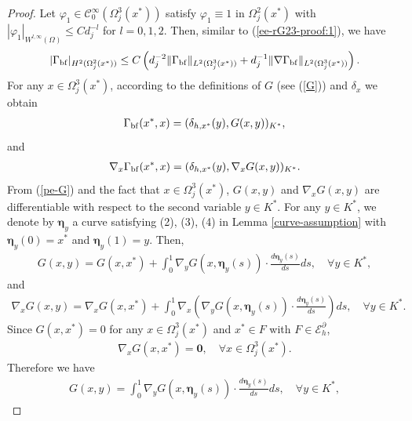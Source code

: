 \documentclass[1996/10/24]{amsart}
\theoremstyle{definition}
\numberwithin{equation}{section}
\begin{document}
\begin{proof}
Let $\varphi_1\in\mathcal{C}_0^{\infty}(\Omega_j^3(x^{\ast}))$ satisfy $\varphi_1\equiv1$ in $\Omega_j^2(x^{\ast})$
with $|\varphi_1|_{W^{l,\infty}(\Omega)}\leq Cd_j^{-l}$ for $l=0,1,2$. Then, similar to (\ref{ee-rG23-proof:1}), we have
\begin{align}
|\Gamma_{{\rm bf}}|_{H^2(\Omega_j^2(x^{\ast}))}\leq C\left(d_j^{-2}\|\Gamma_{{\rm bf}}\|_{L^2(\Omega_j^3(x^{\ast}))}+d_j^{-1}\|\nabla\Gamma_{{\rm bf}}\|_{L^2(\Omega_j^3(x^{\ast}))}\right).\label{ee-rG23-proof:2}
\end{align}
For any $x\in\Omega_j^3(x^{\ast})$, according to the definitions of $G$ (see (\ref{G})) and $\delta_x$ we obtain
\begin{align}
\Gamma_{{\rm bf}}(x^{\ast},x)=(\delta_{h,x^{\ast}}(y), G(x,y))_{K^{\ast}},\label{ee-rG23-proof:3}
\end{align}
and
\begin{align}
\nabla_x\Gamma_{{\rm bf}}(x^{\ast},x)=(\delta_{h,x^{\ast}}(y), \nabla_xG(x,y))_{K^{\ast}}.\label{ee-rG23-proof:4}
\end{align}
From (\ref{pe-G}) and the fact that $x \in \Omega_{j}^{3}(x^{\ast})$, $G(x,y)$ and $\nabla_xG(x,y)$ are
differentiable with respect to the second variable $y \in K^{\ast}$. For any $y \in K^{\ast}$, we denote by
$\boldsymbol{\eta}_{y}$ a curve satisfying (2), (3), (4) in Lemma \ref{curve-assumption} with $\boldsymbol{\eta}_{y}(0) = x^{\ast}$
and $\boldsymbol{\eta}_{y}(1) = y$. Then,
\begin{align*}
G(x,y)= G(x, x^{\ast}) +  \int_{0}^{1} \nabla_{y} G(x,\boldsymbol{\eta}_{y}(s))\cdot
\frac{d\boldsymbol{\eta}_{y}(s)}{ds}ds,\quad \forall y\in K^{\ast},
\end{align*}
and
\begin{align*}
\nabla_x G(x,y)= \nabla_{x} G(x,x^{\ast}) + \int_{0}^{1} \nabla_x\left(\nabla_yG(x,\boldsymbol{\eta}_{y}(s))
\cdot \frac{d \boldsymbol{\eta}_{y}(s)}{ds} \right) ds ,\quad \forall y\in K^{\ast}.
\end{align*}
Since $G(x,x^{\ast})=0$ for any $x\in \Omega_{j}^{3}(x^{\ast})$ and $x^{\ast}\in F$ with $F\in \mathcal{E}_h^{\partial}$,
\begin{align*}
\nabla_{x} G(x,x^{\ast}) = \boldsymbol{0}, \quad \forall x\in \Omega_{j}^{3}(x^{\ast}).
\end{align*}
Therefore we have
\begin{align}
\label{boundary_eq1}
G(x,y)= \int_{0}^{1} \nabla_{y} G(x,\boldsymbol{\eta}_{y}(s))\cdot
\frac{d\boldsymbol{\eta}_{y}(s)}{ds}ds,\quad \forall y\in K^{\ast},
\end{align}

\end{proof}
\end{document}
